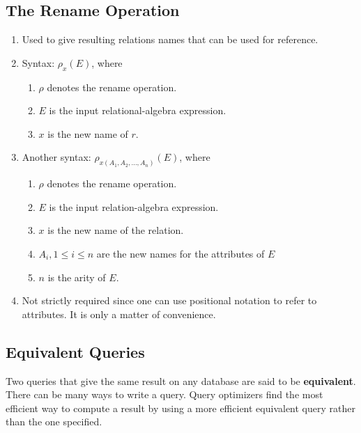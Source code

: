 \documentclass[journal,12pt,twocolumn]{IEEEtran}
\begin{document}
\subsection{The Rename Operation}
\begin{enumerate}
    \item Used to give resulting relations names that can be used for reference.
    \item Syntax: $\rho_x(E)$, where
    \begin{enumerate}
        \item $\rho$ denotes the rename operation.
        \item $E$ is the input relational-algebra expression.
        \item $x$ is the new name of $r$.
    \end{enumerate}
    \item Another syntax: $\rho_{x(A_1, A_2, \ldots, A_n)}(E)$, where
    \begin{enumerate}
        \item $\rho$ denotes the rename operation.
        \item $E$ is the input relation-algebra expression.
        \item $x$ is the new name of the relation.
        \item $A_i, 1 \leq i \leq n$ are the new names for the attributes of $E$
        \item $n$ is the arity of $E$.
    \end{enumerate}
    \item Not strictly required since one can use positional notation to refer 
    to attributes. It is only a matter of convenience.
\end{enumerate}

\subsection{Equivalent Queries}

Two queries that give the same result on any database are said to be 
\textbf{equivalent}. There can be many ways to write a query. Query optimizers 
find the most efficient way to compute a result by using a more efficient 
equivalent query rather than the one specified.
\end{document}
